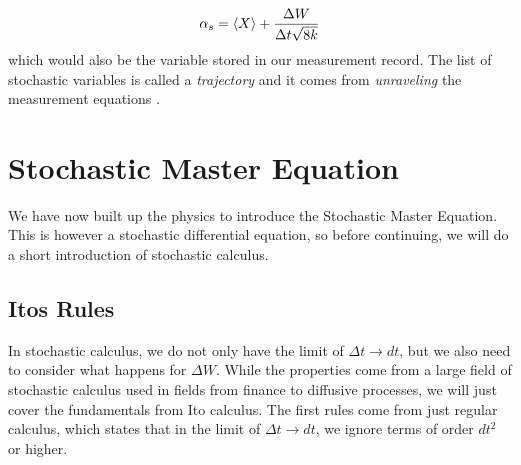 \begin{equation}
    \alpha_s = \expval{X} + \frac{\Delta W}{\Delta t \sqrt{8k}}
\end{equation}
which would also be the variable stored in our measurement record. The list of stochastic variables is called a \textit{trajectory} and it comes from \textit{unraveling} the measurement equations \cite{jacobs_straightforward_2006}.

\section{Stochastic Master Equation}
We have now built up the physics to introduce the Stochastic Master Equation. This is however a stochastic differential equation, so before continuing, we will do a short introduction of stochastic calculus.  

\subsection{Itos Rules}
In stochastic calculus, we do not only have the limit of $\Delta t \to dt$, but we also need to consider what happens for $\Delta W$. While the properties come from a large field of stochastic calculus used in fields from finance to diffusive processes, we will just cover the fundamentals from Ito calculus. The first rules come from just regular calculus, which states that in the limit of $\Delta t \to dt$, we ignore terms of order $dt^2$ or higher. 

